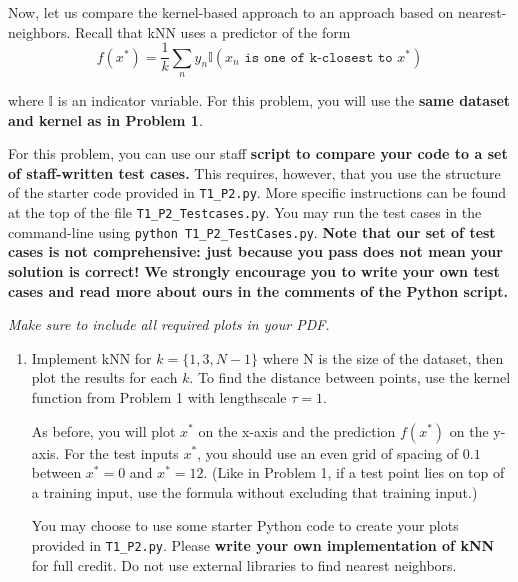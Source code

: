 \documentclass[submit]{harvardml}
\begin{document}

\begin{problem}

Now, let us compare the kernel-based approach to an approach based on
nearest-neighbors.  Recall that kNN uses a predictor of the form
  \begin{equation*}
    f(x^*) = \frac{1}{k} \sum_n y_n \mathbb{I}(x_n \texttt{ is one of k-closest to } x^*)
  \end{equation*}

\noindent where $\mathbb{I}$ is an indicator variable. For this problem, you will use the \textbf{same dataset and kernel as in Problem 1}.


For this problem, you can use our staff \textbf{script to compare your code to a set of staff-written test cases.} This requires, however, that you use the structure of the starter code provided in \texttt{T1\_P2.py}. More specific instructions can be found at the top of the file \texttt{T1\_P2\_Testcases.py}. You may run the test cases in the command-line using \texttt{python T1\_P2\_TestCases.py}.
\textbf{Note that our set of test cases is not comprehensive: just because you pass does not mean your solution is correct! We strongly encourage you to write your own test cases and read more about ours in the comments of the Python script.}

\vspace{0.5cm}
\noindent\emph{Make sure to include all required plots in your PDF.}


\begin{enumerate}

\item Implement kNN for $k=\{1, 3, N-1\}$ where N is the size of the dataset, then plot the results for each $k$. To find the distance between points, use the kernel function from Problem 1 with lengthscale $\tau=1$. 

As before, you will plot $x^*$ on the x-axis and the prediction $f(x^*)$ on the y-axis.  For the test inputs $x^*$, you should use an even grid of spacing of $0.1$ between $x^* = 0$ and $x^* = 12$.  (Like in Problem 1, if a test point lies on top of a training input, use the formula without excluding that training input.)
  
  You may choose to use some starter Python code to create your plots
  provided in \verb|T1_P2.py|.  Please \textbf{write your own
    implementation of kNN} for full credit.  Do not use external
  libraries to find nearest neighbors.
  

\end{enumerate}
\end{problem}
\end{document}
